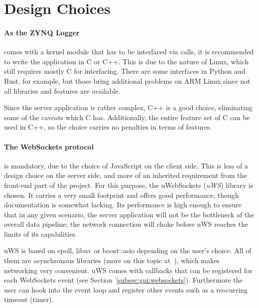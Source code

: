 %
%
\section{Design Choices} %
\label{sec:server:design_choices}

\paragraph{As  the ZYNQ  Logger} comes  with a  kernel module  that has  to be
interfaced via  calls, it  is recommended to write the application
in C or C++. This is due to the nature of Linux, which still requires mostly C
for interfacing. There  are some   interfaces in Python  and Rust,
for example,  but those bring additional  problems on ARM Linux  since not all
libraries and features are available.

Since  the  server application  is  rather  complex,  C++  is a  good  choice,
eliminating some of the caveats  which C has. Additionally, the entire feature
set of C  can be used in C++,  so the choice carries no penalties  in terms of
features.

\paragraph{The  WebSockets  protocol}  is  mandatory, due  to  the  choice  of
JavaScript on the client side.  This is  less of a design choice on the server
side,  and  more of  an  inherited  requirement  from  the front-end  part  of
the  project. For  this  purpose,  the  uWebSockets  (\emph{uWS})  library  is
chosen.  It carries a very small footprint and offers good performance, though
documentation is  somewhat lacking. Its performance  is high enough  to ensure
that in any given scenario, the  server application will not be the bottleneck
of the  overall data pipeline;  the network  connection will choke  before uWS
reaches the limits of its capabilities.

uWS  is  based  on  epoll,  libuv  or  boost::asio  depending  on  the  user's
choice. All  of   them  are  asynchronous   libraries  (more  on   this  topic
at~\cite{uws:async}),  which  makes  networking  very  convenient.  uWS  comes
with  callbacks  that  can  be  registered  for  each  WebSockets  event  (see
Section~\ref{subsec:gui:websockets}). Furthermore the  user can hook  into the
event loop and register other events such as a reocurring timeout (timer).

